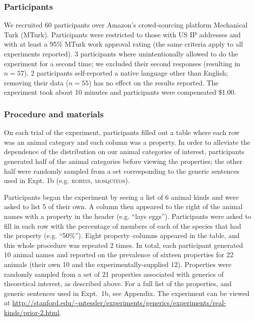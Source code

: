 \documentclass[12pt,letterpaper]{article}
\begin{document}
\subsubsection*{Participants}
We recruited 60 participants over Amazon's crowd-sourcing platform Mechanical Turk (MTurk).  
Participants were restricted to those with US IP addresses and with at least a 95\% MTurk work approval rating (the same criteria apply to all experiments reported). 
3 participants where unintentionally allowed to do the experiment for a second time; we excluded their second responses (resulting in $n=57$).
2 participants self-reported a native language other than English; removing their data ($n=55$) has no effect on the results reported. 
The experiment took about 10 minutes and participants were compensated \$1.00.

\subsubsection*{Procedure and materials}
On each trial of the experiment, participants filled out a table where each row was an animal category and each column was a property. 
In order to alleviate the dependence of the distribution on our animal categories of interest, participants generated half of the animal categories before viewing the properties; the other half were randomly sampled from a set corresponding to the generic sentences used in Expt. 1b (e.g. \textsc{robins, mosquitos}).

Participants began the experiment by seeing a list of 6 animal kinds and were asked to list 5 of their own.
A column then appeared to the right of the animal names with a property in the header (e.g. ``lays eggs'').
Participants were asked to fill in each row with the percentage of members of each of the species that had the property (e.g. ``50\%'').
Eight property--columns appeared in the table, and this whole procedure was repeated 2 times.
In total, each participant generated 10 animal names and reported on the prevalence of sixteen properties for 22 animals (their own 10 and the experimentally-supplied 12). 
Properties were randomly sampled from a set of 21 properties associated with generics of theoretical interest, as described above.
For a full list of the properties, and generic sentences used in Expt.~1b, see Appendix.
The experiment can be viewed at \url{http://stanford.edu/~mtessler/experiments/generics/experiments/real-kinds/prior-2.html}.
\end{document}
